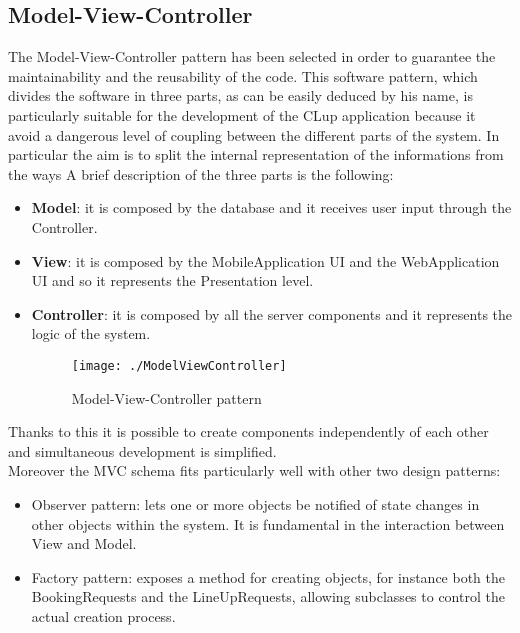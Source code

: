 \subsection{Model-View-Controller} 
The Model-View-Controller pattern has been selected in order to guarantee the maintainability and the reusability of the code. This software pattern, which divides the software in three parts, as can be easily deduced by his name, is particularly suitable for the development of the CLup application because it avoid a dangerous level of coupling between the different parts of the system. In particular the aim is to split the internal representation of the informations from the ways A brief description of the three parts is the following: 
\begin{itemize}
	\item \textbf{Model}: it is composed by the database and it receives user input through the Controller. 
	\item \textbf{View}: it is composed by the MobileApplication UI and the WebApplication UI and so it represents the Presentation level.
	\item \textbf{Controller}: it is composed by all the server components and it represents the logic of the system.\\
\begin{figure}[H]
\centerline{\texttt{[image: ./ModelViewController]}}
\caption{Model-View-Controller pattern}
\end{figure}
\end{itemize}
Thanks to this it is possible to create components independently of each other and simultaneous development is simplified.   \\
Moreover the MVC schema fits particularly well with other two design patterns:
\begin{itemize}
	\item Observer pattern: lets one or more objects be notified of state changes in other objects within the system. It is fundamental in the interaction between View and Model.
	\item Factory pattern: exposes a method for creating objects, for instance both the BookingRequests and the LineUpRequests, allowing subclasses to control the actual creation process.
\end{itemize}





 
 